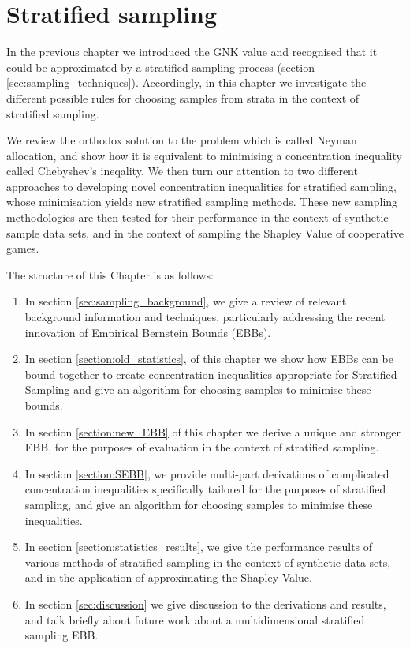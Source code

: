 \chapter{Stratified sampling}\label{chap:stratified_sampling_chapter}

In the previous chapter we introduced the GNK value and recognised that it could be approximated by a stratified sampling process (section \ref{sec:sampling_techniques}).
Accordingly, in this chapter we investigate the different possible rules for choosing samples from strata in the context of stratified sampling.

We review the orthodox solution to the problem which is called Neyman allocation, and show how it is equivalent to minimising a concentration inequality called Chebyshev's ineqality.
We then turn our attention to two different approaches to developing novel concentration inequalities for stratified sampling, whose minimisation yields new stratified sampling methods.
These new sampling methodologies are then tested for their performance in the context of synthetic sample data sets, and in the context of sampling the Shapley Value of cooperative games.

The structure of this Chapter is as follows:
\begin{enumerate}
\item	In section \ref{sec:sampling_background}, we give a review of relevant background information and techniques, particularly addressing the recent innovation of Empirical Bernstein Bounds (EBBs).
\item	In section \ref{section:old_statistics}, of this chapter we show how EBBs can be bound together to create concentration inequalities appropriate for Stratified Sampling and give an algorithm for choosing samples to minimise these bounds.
\item	In section \ref{section:new_EBB} of this chapter we derive a unique and stronger EBB, for the purposes of evaluation in the context of stratified sampling.
\item	In section \ref{section:SEBB}, we provide multi-part derivations of complicated concentration inequalities specifically tailored for the purposes of stratified sampling, and give an algorithm for choosing samples to minimise these inequalities.
\item	In section \ref{section:statistics_results}, we give the performance results of various methods of stratified sampling in the context of synthetic data sets, and in the application of approximating the Shapley Value.
\item	In section \ref{sec:discussion} we give discussion to the derivations and results, and talk briefly about future work about a multidimensional stratified sampling EBB.
\end{enumerate}


